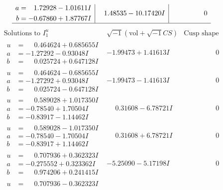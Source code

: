 \documentclass[1p]{elsarticle_modified}
\theoremstyle{definition}
\newcommand{\I}{\sqrt{-1}}
\begin{document}
$$\begin{array}{c|c|c}
\begin{aligned}
a &= \phantom{-}1.72928 - 1.01611 I \\
b &= -0.67860 + 1.87767 I\end{aligned}
 & \phantom{-}1.48535 - 10.17420 I & \phantom{-0.000000 } 0\\
 \hline 
 \end{array}$$\newpage$$\begin{array}{c|c|c}  
\text{Solutions to }I^u_{1}& \I (\text{vol} + \sqrt{-1}CS) & \text{Cusp shape}\\
 \hline 
\begin{aligned}
u &= \phantom{-}0.464624 + 0.685655 I \\
a &= -1.27292 - 0.93048 I \\
b &= \phantom{-}0.025724 + 0.647128 I\end{aligned}
 & -1.99473 + 1.41613 I & \phantom{-0.000000 } 0 \\ \hline\begin{aligned}
u &= \phantom{-}0.464624 - 0.685655 I \\
a &= -1.27292 + 0.93048 I \\
b &= \phantom{-}0.025724 - 0.647128 I\end{aligned}
 & -1.99473 - 1.41613 I & \phantom{-0.000000 } 0 \\ \hline\begin{aligned}
u &= \phantom{-}0.589028 + 1.017350 I \\
a &= -0.78540 + 1.70504 I \\
b &= -0.83917 - 1.14462 I\end{aligned}
 & \phantom{-}0.31608 - 6.78721 I & \phantom{-0.000000 } 0 \\ \hline\begin{aligned}
u &= \phantom{-}0.589028 - 1.017350 I \\
a &= -0.78540 - 1.70504 I \\
b &= -0.83917 + 1.14462 I\end{aligned}
 & \phantom{-}0.31608 + 6.78721 I & \phantom{-0.000000 } 0 \\ \hline\begin{aligned}
u &= \phantom{-}0.707936 + 0.362323 I \\
a &= -0.275552 + 0.323362 I \\
b &= \phantom{-}0.974206 + 0.241415 I\end{aligned}
 & -5.25090 - 5.17198 I & \phantom{-0.000000 } 0 \\ \hline\begin{aligned}
u &= \phantom{-}0.707936 - 0.362323 I \\

\end{aligned}
\end{array}$$
\end{document}
